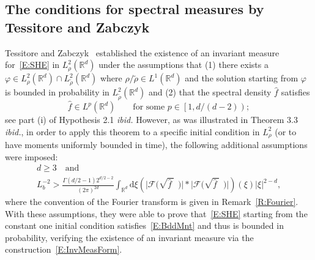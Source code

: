 \documentclass[sn-mathphys]{sn-jnl}%
\renewcommand{\R}{\mathbb{R}}
\newcommand{\ud}{\ensuremath{\mathrm{d}}}
\numberwithin{equation}{section}
\theoremstyle{thmstyleone}%
\theoremstyle{thmstyletwo}%
\theoremstyle{thmstylethree}%
\begin{document}
\subsection{The conditions for spectral measures by Tessitore and Zabczyk}\label{SS:TessZabz}

Tessitore and Zabczyk~\cite{tessitore.zabczyk:98:invariant} established the existence of an
invariant measure for~\eqref{E:SHE} in $L^2_{\rho}(\R^d)$ under the assumptions that (1) there
exists a $\varphi \in L^2_{\rho}(\R^d) \cap L^2_{\widetilde\rho}(\R^d)$ where $\rho/\widetilde\rho
\in L^1 (\R^d)$ and the solution starting from $\varphi$ is bounded in probability in
$L^2_{\widetilde \rho}(\R^d)$ and (2) that the spectral density $\hat{f}$ satisfies
\begin{equation}\label{E:CorTZ}
\widehat{f} \in L^p (\R^d) \qquad \text{for some $p \in \left[1, d/(d-2)\right)$};
\end{equation}
see part (i) of Hypothesis 2.1 \textit{ibid.} However, as was illustrated in Theorem 3.3
\textit{ibid.}, in order to apply this theorem to a specific initial condition in $L^2_{\rho}$ (or
to have moments uniformly bounded in time), the following additional assumptions were imposed:
\begin{equation}\label{E:TZspec}
  \begin{gathered}
  d\ge 3 \quad \text{and} \quad \\
  L_b^{-2}> \frac{\Gamma(d/2 -1)2^{d/2-2}}{(2\pi)^{2d}} \int_{\R^d} \ud \xi\left(\lvert \mathcal{F}\big(\sqrt{\widehat{f}\:}\:\:\big) \rvert * \lvert \mathcal{F}\big(\sqrt{\widehat{f}\:}\:\:\big)\rvert\right) (\xi) \lvert \xi \rvert^{2-d} ,
  \end{gathered}
\end{equation}
where the convention of the Fourier transform is given in Remark~\ref{R:Fourier}. With these
assumptions, they were able to prove that~\eqref{E:SHE} starting from the constant one initial
condition satisfies~\eqref{E:BddMnt} and thus is bounded in probability, verifying the existence of
an invariant measure via the construction~\eqref{E:InvMeasForm}.

\end{document}

